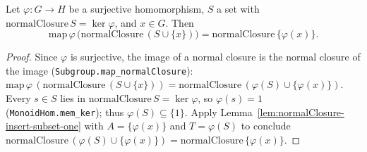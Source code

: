 \begin{lemma}
    \label{lem:map-normalClosure-insert}
    \leanok
    Let $\varphi : G \to H$ be a surjective homomorphism, $S$ a set with
    $\mathrm{normalClosure}\,S = \ker\varphi$, and $x \in G$. Then
    \[
        \mathrm{map}\,\varphi\,\bigl(\mathrm{normalClosure}\,(S \cup \{x\})\bigr)
        = \mathrm{normalClosure}\,\{\varphi(x)\}.
    \]
\end{lemma}
\begin{proof}
    Since $\varphi$ is surjective, the image of a normal closure is the normal
    closure of the image (\texttt{Subgroup.map\_normalClosure}):
    $\mathrm{map}\,\varphi\,(\mathrm{normalClosure}\,(S \cup \{x\})) =
    \mathrm{normalClosure}\,(\varphi(S) \cup \{\varphi(x)\})$. Every $s \in S$ lies
    in $\mathrm{normalClosure}\,S = \ker\varphi$, so $\varphi(s) = 1$
    (\texttt{MonoidHom.mem\_ker}); thus $\varphi(S) \subseteq \{1\}$. Apply
    Lemma~\ref{lem:normalClosure-insert-subset-one} with $A = \{\varphi(x)\}$ and
    $T = \varphi(S)$ to conclude
    $\mathrm{normalClosure}\,(\varphi(S) \cup \{\varphi(x)\}) =
    \mathrm{normalClosure}\,\{\varphi(x)\}$.
\end{proof}


